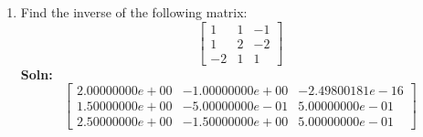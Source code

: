 \documentclass[12,a4paper]{article}
\begin{document}
\begin{enumerate}
        \item Find the inverse of the following matrix:\\
            \[
            \begin{bmatrix}
                1 & 1 & -1 \\
                1 & 2 & -2 \\
                -2 & 1 & 1
            \end{bmatrix}
            \]
            \textbf{Soln:}\\
            \[
                \begin{bmatrix}
                2.00000000e+00 & -1.00000000e+00 & -2.49800181e-16 \\
                1.50000000e+00 & -5.00000000e-01 &  5.00000000e-01 \\
                2.50000000e+00 & -1.50000000e+00 &  5.00000000e-01
                \end{bmatrix}
            \]
    \end{enumerate}
    
\end{document}

